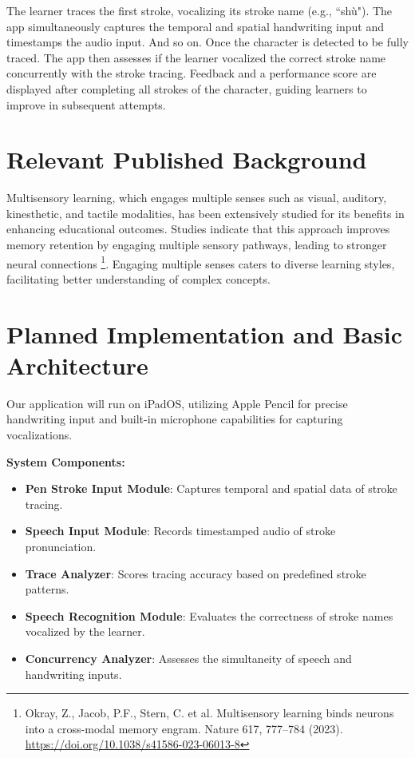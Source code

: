 \documentclass{article}
\begin{document}
The learner traces the first stroke, vocalizing its stroke name (e.g., ``shù"). The app simultaneously captures the temporal and spatial handwriting input and timestamps the audio input. And so on. Once the character is detected to be fully traced. The app then assesses if the learner vocalized the correct stroke name concurrently with the stroke tracing. Feedback and a performance score are displayed after completing all strokes of the character, guiding learners to improve in subsequent attempts.

\section*{Relevant Published Background}

Multisensory learning, which engages multiple senses such as visual, auditory, kinesthetic, and tactile modalities, has
been extensively studied for its benefits in enhancing educational outcomes. Studies indicate that this approach
improves memory retention by engaging multiple sensory pathways, leading to stronger neural connections
\footnote{Okray, Z., Jacob, P.F., Stern, C. et al. Multisensory learning binds neurons into a cross-modal memory engram. Nature 617, 777–784 (2023). \href{https://doi.org/10.1038/s41586-023-06013-8}{https://doi.org/10.1038/s41586-023-06013-8}}. Engaging multiple senses caters to diverse learning styles, facilitating better understanding of
complex concepts.


\section*{Planned Implementation and Basic Architecture}
Our application will run on iPadOS, utilizing Apple Pencil for precise handwriting input and built-in microphone capabilities for capturing vocalizations.

\textbf{System Components:}
\begin{itemize}
    \item \textbf{Pen Stroke Input Module}: Captures temporal and spatial data of stroke tracing.
    \item \textbf{Speech Input Module}: Records timestamped audio of stroke pronunciation.
    \item \textbf{Trace Analyzer}: Scores tracing accuracy based on predefined stroke patterns.
    \item \textbf{Speech Recognition Module}: Evaluates the correctness of stroke names vocalized by the learner.
    \item \textbf{Concurrency Analyzer}: Assesses the simultaneity of speech and handwriting inputs.
\end{itemize}
\end{document}
